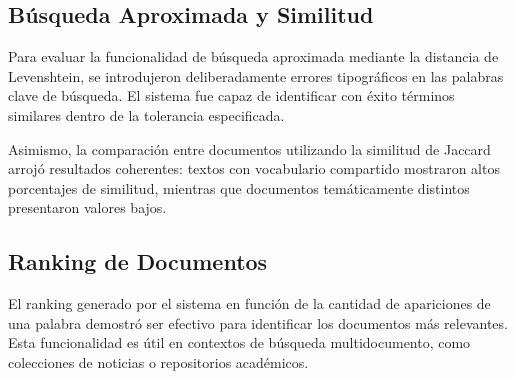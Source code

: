 \documentclass[9pt,letterpaper,onecolumn]{rho-class/rho}
\begin{document}

\subsection{Búsqueda Aproximada y Similitud}

Para evaluar la funcionalidad de búsqueda aproximada mediante la distancia de Levenshtein, se introdujeron deliberadamente errores tipográficos en las palabras clave de búsqueda. El sistema fue capaz de identificar con éxito términos similares dentro de la tolerancia especificada.

Asimismo, la comparación entre documentos utilizando la similitud de Jaccard arrojó resultados coherentes: textos con vocabulario compartido mostraron altos porcentajes de similitud, mientras que documentos temáticamente distintos presentaron valores bajos.


\subsection{Ranking de Documentos}

El ranking generado por el sistema en función de la cantidad de apariciones de una palabra demostró ser efectivo para identificar los documentos más relevantes. Esta funcionalidad es útil en contextos de búsqueda multidocumento, como colecciones de noticias o repositorios académicos.
\end{document}
